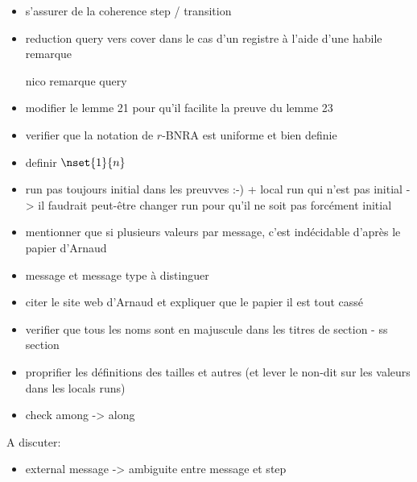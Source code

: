 \begin{itemize}
	\item s'assurer de la coherence step / transition
    \item reduction query vers cover dans le cas d'un registre à l'aide d'une habile remarque
    \item[nico] remarque query 
    \item modifier le lemme 21 pour qu'il facilite la preuve du lemme 23
    \item verifier que la notation de $r$-BNRA est uniforme et bien definie
    \item definir $\nset{1}{n}$
    \item run pas toujours initial dans les preuvves :-) + local run qui n'est pas initial -> il faudrait peut-être changer run pour qu'il ne soit pas forcément initial
    \item mentionner que si plusieurs valeurs par message, c'est indécidable d'après le papier d'Arnaud
    \item message et message type à distinguer 
    \item citer le site web d'Arnaud et expliquer que le papier il est tout cassé
    \item verifier que tous les noms sont en majuscule dans les titres de section - ss section
    \item proprifier les définitions des tailles et autres (et lever le non-dit sur les valeurs dans les locals runs)
    \item check among -> along
\end{itemize}

A discuter:
\begin{itemize}
\item external message -> ambiguite entre message et step 
\end{itemize}